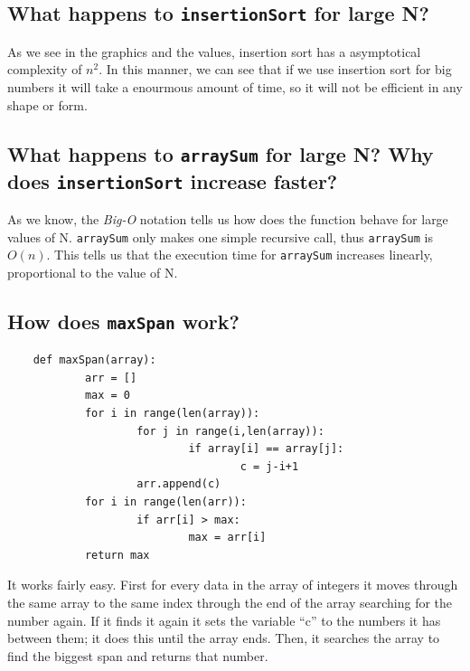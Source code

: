 \documentclass[a4paper,12pt]{article}
\begin{document}
    \subsection{What happens to \texttt{insertionSort} for large N?}
    As we see in the graphics and the values, insertion sort has a asymptotical
complexity of $n^2$. In this manner, we can see that if we use insertion sort for
big numbers it will take a enourmous amount of time, so it will not be
efficient in any shape or form.

  \subsection{What happens to \texttt{arraySum} for large N? Why does \texttt{insertionSort} increase faster?}
    As we know, the \textit{Big-O} notation tells us how does the function behave for large values of N.
    \texttt{arraySum} only makes one simple recursive call, thus \texttt{arraySum} is $O(n)$. This tells us
    that the execution time for \texttt{arraySum} increases linearly, proportional to the value of N. 
  \subsection{How does \texttt{maxSpan} work?}
  \begin{Verbatim}
    def maxSpan(array):
            arr = []
            max = 0
            for i in range(len(array)):
                    for j in range(i,len(array)):
                            if array[i] == array[j]:
                                    c = j-i+1
                    arr.append(c)
            for i in range(len(arr)):
                    if arr[i] > max:
                            max = arr[i]
            return max
  \end{Verbatim}
It works fairly easy. First for every data in the array of integers it moves
through the same array to the same index through the end of the array
searching for the number again. If it finds it again it sets the variable ``c''
to the numbers it has between them; it does this until the array ends. Then,
it searches the array to find the biggest span and returns that number.
\end{document}
